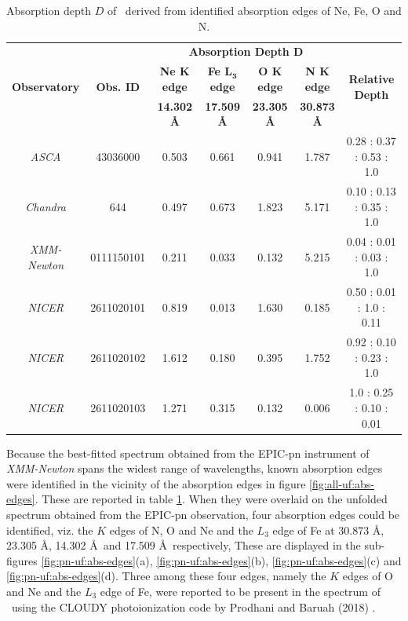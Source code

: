    \begin{table}[!htb]
    	\centering
    	\caption{Absorption depth $D$ of \source\ derived from identified absorption edges of Ne, Fe, O and N.}
    	\label{tab:abs-depth}
		\begin{tabular}{ccccccc}
			\hline
			\multirow{3}{*}{\textbf{Observatory}} & \multirow{3}{*}{\textbf{Obs. ID}} & \multicolumn{4}{c}{\textbf{Absorption Depth $\boldsymbol{D}$}} & \multirow{3}{*}{\textbf{Relative Depth}} \\ \cline{3-6} & & \textbf{Ne $\boldsymbol{K}$ edge} & \textbf{Fe $\boldsymbol{L_3}$ edge} & \textbf{O $\boldsymbol{K}$ edge} & \textbf{N $\boldsymbol{K}$ edge} \\ \cline{3-6} & & \textbf{14.302 \AA} & \textbf{17.509 \AA} & \textbf{23.305 \AA} & \textbf{30.873 \AA} \\
			\hline
			{\textit{ASCA}} & {43036000} & {0.503} & {0.661} & {0.941} & {1.787} & {0.28 : 0.37 : 0.53 : 1.0} \\ %
			{\textit{Chandra}} & {644} & {0.497} & {0.673} & {1.823} & {5.171} & {0.10 : 0.13 : 0.35 : 1.0} \\ %
			{\textit{XMM-Newton}} & {0111150101} & {0.211} & {0.033} & {0.132} & {5.215} & {0.04 : 0.01 : 0.03 : 1.0} \\ %
			{\textit{NICER}} & {2611020101} & {0.819} & {0.013} & {1.630} & {0.185} & {0.50 : 0.01 : 1.0 : 0.11} \\ %
			{\textit{NICER}} & {2611020102} & {1.612} & {0.180} & {0.395} & {1.752} & {0.92 : 0.10 : 0.23 : 1.0} \\ %
			{\textit{NICER}} & {2611020103} & {1.271} & {0.315} & {0.132} & {0.006} & {1.0 : 0.25 : 0.10 : 0.01} \\ %
			\hline
		\end{tabular}
	\end{table}

    Because the best-fitted spectrum obtained from the EPIC-pn instrument of \textit{XMM-Newton} spans the widest range of wavelengths, known absorption edges \cite{bearden1967reevaluation,juett2006high} were identified in the vicinity of the absorption edges in figure \ref{fig:all-uf:abs-edges}. These are reported in table \ref{tab:abs-depth}. When they were overlaid on the unfolded spectrum obtained from the EPIC-pn observation, four absorption edges could be identified, viz. the $K$ edges of N, O and Ne and the $L_3$ edge of Fe at 30.873 \AA, 23.305 \AA, 14.302 \AA\ and 17.509 \AA\ respectively, These are displayed in the sub-figures \ref{fig:pn-uf:abs-edges}(a), \ref{fig:pn-uf:abs-edges}(b), \ref{fig:pn-uf:abs-edges}(c) and \ref{fig:pn-uf:abs-edges}(d). Three among these four edges, namely the $K$ edges of O and Ne and the $L_3$ edge of Fe, were reported to be present in the spectrum of \source\ using the CLOUDY photoionization code by Prodhani and Baruah (2018) \cite{prodhani2018galactic}.
    
